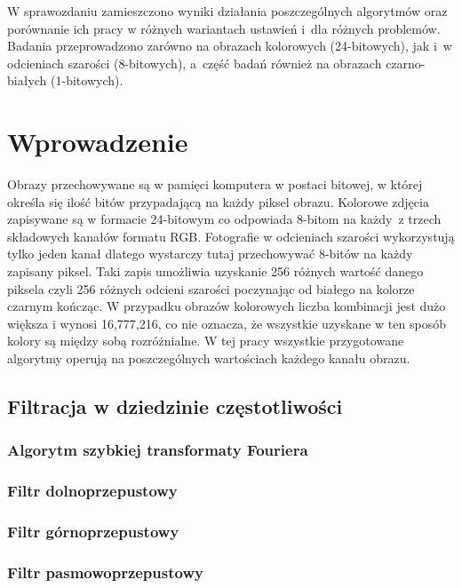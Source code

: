 \documentclass{classrep}
\begin{document}
W sprawozdaniu zamieszczono wyniki działania poszczególnych algorytmów oraz porównanie ich pracy w różnych wariantach ustawień i~dla różnych problemów. Badania przeprowadzono zarówno na obrazach kolorowych (24-bitowych), jak i~w odcieniach szarości (8-bitowych), a~część badań również na obrazach czarno-białych (1-bitowych). 

\section{Wprowadzenie}
Obrazy przechowywane są w pamięci komputera w postaci bitowej, w której określa się ilość bitów przypadającą na każdy piksel obrazu. Kolorowe zdjęcia zapisywane są w formacie 24-bitowym co odpowiada 8-bitom na każdy~z trzech składowych kanałów formatu RGB. Fotografie w odcieniach szarości wykorzystują tylko jeden kanał dlatego wystarczy tutaj przechowywać 8-bitów na każdy zapisany piksel. Taki zapis umożliwia uzyskanie 256 różnych wartość danego piksela czyli 256 różnych odcieni szarości poczynając od białego na kolorze czarnym kończąc. W przypadku obrazów kolorowych liczba kombinacji jest dużo większa i wynosi 16,777,216, co nie oznacza, że wszystkie uzyskane w ten sposób kolory są między sobą rozróżnialne. W tej pracy wszystkie przygotowane algorytmy operują na poszczególnych wartościach każdego kanału obrazu.

\subsection{Filtracja w dziedzinie częstotliwości}

\subsubsection{Algorytm szybkiej transformaty Fouriera}

\subsubsection{Filtr dolnoprzepustowy}

\subsubsection{Filtr górnoprzepustowy}

\subsubsection{Filtr pasmowoprzepustowy}
\end{document}

